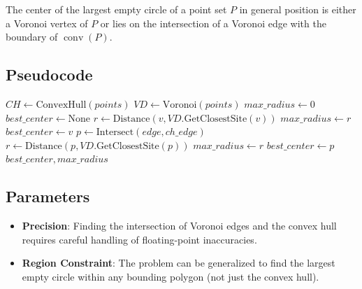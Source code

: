 \begin{theorem}\label{thm:lec_optimality}
The center of the largest empty circle of a point set $P$ in general position is either a Voronoi vertex of $P$ or lies on the intersection of a Voronoi edge with the boundary of $\operatorname{conv}(P)$.
\end{theorem}

\subsection{Pseudocode}

\begin{algorithm}[htbp]
\caption{Largest Empty Circle}
\label{alg:largest_empty_circle}
\begin{algorithmic}[1]
  \State $CH \gets \text{ConvexHull}(points)$
  \State $VD \gets \text{Voronoi}(points)$
  \State $max\_radius \gets 0$
  \State $best\_center \gets \text{None}$
      \State $r \gets \text{Distance}(v, VD.\text{GetClosestSite}(v))$
        \State $max\_radius \gets r$
        \State $best\_center \gets v$
      \EndIf
    \EndIf
  \EndFor
      \State $p \gets \text{Intersect}(edge, ch\_edge)$
        \State $r \gets \text{Distance}(p, VD.\text{GetClosestSite}(p))$
          \State $max\_radius \gets r$
          \State $best\_center \gets p$
        \EndIf
      \EndIf
    \EndFor
  \EndFor
  \State \Return $best\_center, max\_radius$
\EndFunction
\end{algorithmic}
\end{algorithm}

\subsection{Parameters}

\begin{itemize}
\item \textbf{Precision}: Finding the intersection of Voronoi edges and the convex hull requires careful handling of floating-point inaccuracies.
\item \textbf{Region Constraint}: The problem can be generalized to find the largest empty circle within any bounding polygon (not just the convex hull).
\end{itemize}

